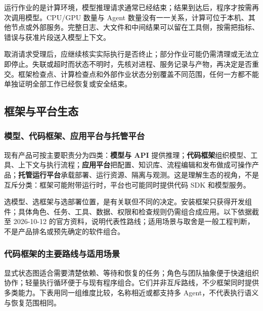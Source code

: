\documentclass[11pt,a4paper]{article}
\begin{document}
运行作业的是计算环境，模型推理请求通常已经结束；结果到达后，程序才按需再次调用模型。CPU/GPU 数量与 Agent 数量没有一一关系，计算可位于本机、其他节点或外部服务。完整日志、大文件和中间结果可以留在工具侧，按需把指标、错误与获准片段送入模型上下文。

取消请求受理后，应继续核实实际执行是否终止；部分作业可能仍需清理或无法立即停止。失联或超时而状态不明时，先核对进程、服务记录与产物，再决定是否重交。框架检查点、计算检查点和外部作业状态分别覆盖不同范围，任何一方都不能单独证明全部工作已经恢复或安全结束。

\subsection{框架与平台生态}
\label{sec:agent-ecosystem}

\subsubsection{模型、代码框架、应用平台与托管平台}

现有产品可按主要职责分为四类：\textbf{模型与 API} 提供推理；\textbf{代码框架}组织模型、工具、上下文与执行流程；\textbf{应用平台}把配置、知识库、流程编辑和发布做成可操作产品；\textbf{托管运行平台}承载部署、运行资源、隔离与观测。这是理解生态的视角，不是互斥分类：框架可能附带运行时，平台也可能同时提供代码 SDK 和模型服务。

选模型、选框架与选部署位置，是有关联但不同的决定。安装框架只获得开发组件；具体角色、任务、工具、数据、权限和检查规则仍需组合成应用。以下依据截至 2026-10-12 的官方资料，说明代表性路线；适用场景与取舍是一般工程判断，不是产品排名或预先确定的软件组合。

\subsubsection{代码框架的主要路线与适用场景}

显式状态图适合需要清楚依赖、等待和恢复的任务；角色与团队抽象便于快速组织协作；轻量执行循环便于与现有程序组合。它们并非互斥路线，不少框架同时提供多类能力。下表用同一组维度比较，名称相近或都支持多 Agent，不代表执行语义与恢复范围相同。
\end{document}
